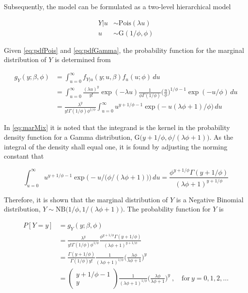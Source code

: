 \documentclass[preprint, 3p, authoryear]{elsarticle} %
\begin{document}
Subsequently, the model can be formulated as a two-level hierarchical model

\begin{subequations} \label{eq:PoisGam}
  \begin{alignat}{2}
    {Y|u} &\sim \mathrm{Pois} (\lambda u) \label{eq:pois_g0} \\ 
    {u} &\sim \mathrm{G}( 1/\phi,\phi) \label{eq:pois_g1}
  \end{alignat}
\end{subequations}

Given \ref{eq:pdfPois} and \ref{eq:pdfGamma}, the probability function for the marginal distribution of \(Y\) is determined from

\begin{equation} \label{eq:marMix}
  \begin{aligned}
    g_{Y}(y;\beta,\phi)&=\int_{u=0}^\infty f_{Y|u}(y;u,\beta) f_{u}(u;\phi) \,du \\
    &=\int_{u=0}^\infty \frac{(\lambda u)^y}{y!} \exp (-\lambda u) \frac{1}{\phi \Gamma(1/\phi)} \bigg(\frac{u}{\phi}\bigg)^{1/\phi-1} \exp (-u /\phi) \,du\\
    &=\frac{\lambda^{y}}{y!\Gamma(1/\phi)\phi^{1/\phi}} \int_{u=0}^\infty u^{y+1/\phi-1} \exp \big(-u(\lambda \phi+1)/\phi\big) \,du
  \end{aligned}
\end{equation}

In \ref{eq:marMix} it is noted that the integrand is the kernel in the probability density function for a Gamma distribution, \(\mathrm{G}\big(y+1/\phi,\phi/(\lambda \phi+1)\big)\). As the integral of the density shall equal one, it is found by adjusting the norming constant that

\begin{equation}
  \int_{u=0}^\infty  u^{ y+ 1/\phi-1} \exp \Big(- u/\big(\phi/( \lambda \phi+1)\big)\Big) \,du = \frac{\phi^{ y+ 1/\phi}\Gamma( y+ 1/\phi)}{( \lambda \phi + 1)^{y+1/\phi}}
\end{equation}

Therefore, it is shown that the marginal distribution of \(Y\) is a Negative Binomial distribution, \(Y\sim\mathrm{NB}\big(1/\phi,1/(\lambda\phi+1)\big)\). The probability function for \(Y\) is

\begin{equation} \label{eq:pdfMix}
  \begin{aligned}
    P[Y=y]&=g_{Y}(y; \beta, \phi) \\
    &=\frac{\lambda^{y}}{y!\Gamma(1/\phi)\phi^{1/\phi}}\frac{\phi^{y+1/\phi}\Gamma(y+1/\phi)}{(\lambda \phi + 1)^{y+1/\phi}} \\
    &=\frac{\Gamma(y+1/\phi)}{\Gamma(1/\phi)y!}\frac{1}{(\lambda\phi+1)^{1/\phi}}\bigg(\frac{\lambda\phi}{\lambda\phi+1}\bigg)^{y} \\
    &=\begin{pmatrix} y+1/\phi-1 \\ y \end{pmatrix} \frac{1}{(\lambda\phi+1)^{1/\phi}}\bigg(\frac{\lambda\phi}{\lambda\phi+1}\bigg)^{y} \ , \quad \mathrm{for} \ y = 0, 1, 2, \dots
  \end{aligned}
\end{equation}
\end{document}
